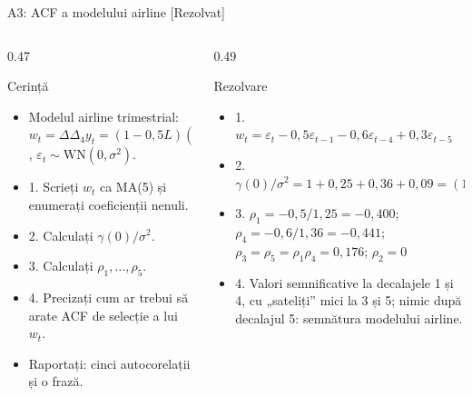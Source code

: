 \begin{frame}{A3: ACF a modelului airline [Rezolvat]}
\itemsize{\scriptsize}
\begin{columns}[T]
\begin{column}{0.47\textwidth}
\begin{block}{Cerință}
\begin{itemize}
    \item Modelul airline trimestrial: $w_t = \Delta\Delta_4 y_t = (1 - 0{,}5L)(1 - 0{,}6L^4)\varepsilon_t$, $\varepsilon_t \sim \mathrm{WN}(0, \sigma^2)$.
    \item 1. Scrieți $w_t$ ca MA(5) și enumerați coeficienții nenuli.
    \item 2. Calculați $\gamma(0)/\sigma^2$.
    \item 3. Calculați $\rho_1, \dots, \rho_5$.
    \item 4. Precizați cum ar trebui să arate ACF de selecție a lui $w_t$.
    \item Raportați: cinci autocorelații și o frază.
\end{itemize}
\end{block}
\end{column}
\begin{column}{0.49\textwidth}
\begin{exampleblock}{Rezolvare}
\begin{itemize}
    \item 1. $w_t = \varepsilon_t - 0{,}5\varepsilon_{t-1} - 0{,}6\varepsilon_{t-4} + 0{,}3\varepsilon_{t-5}$
    \item 2. $\gamma(0)/\sigma^2 = 1 + 0{,}25 + 0{,}36 + 0{,}09 = (1 + 0{,}25)(1 + 0{,}36) = 1{,}70$
    \item 3. $\rho_1 = -0{,}5/1{,}25 = -0{,}400$; $\rho_4 = -0{,}6/1{,}36 = -0{,}441$; $\rho_3 = \rho_5 = \rho_1\rho_4 = 0{,}176$; $\rho_2 = 0$
    \item 4. Valori semnificative la decalajele 1 și 4, cu „sateliți” mici la 3 și 5; nimic după decalajul 5: semnătura modelului airline.
\end{itemize}
\end{exampleblock}
\end{column}
\end{columns}
\end{frame}

